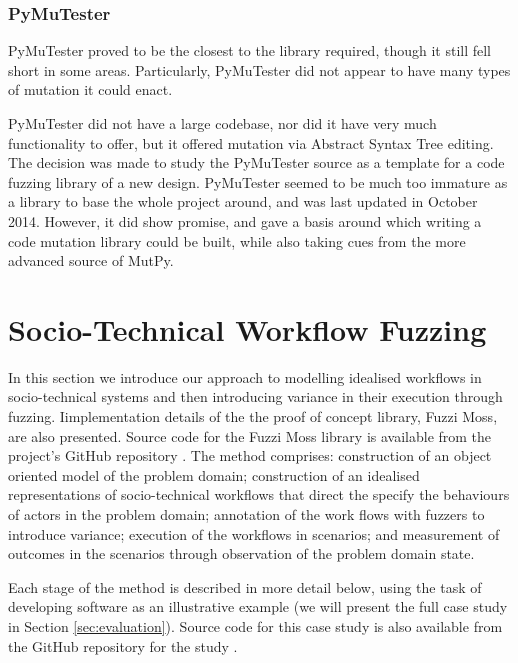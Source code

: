 \documentclass{sig-alternate}
\begin{document}
\subsubsection{PyMuTester}
\label{fuzzing_pymutester}
PyMuTester\cite{PyMutTester} proved to be the closest to the library required, though it still fell short in some areas. Particularly, PyMuTester did not appear to have many types of mutation it could enact. \par

PyMuTester did not have a large codebase\cite{PyMutTester}, nor did it have very much functionality to offer, but it offered mutation via Abstract Syntax Tree editing. The decision was made to study the PyMuTester source as a template for a code fuzzing library of a new design. PyMuTester seemed to be much too immature as a library to base the whole project around, and was last updated in October 2014. However, it did show promise, and gave a basis around which writing a code mutation library could be built, while also taking cues from the more advanced source of MutPy\cite{mutpy26}. \par



\section{Socio-Technical Workflow Fuzzing}


In this section we introduce our approach to modelling idealised workflows in
socio-technical systems and then introducing variance in their execution through
fuzzing.  Iimplementation details of the the proof of concept library, Fuzzi
Moss, are also presented.  Source code for the Fuzzi Moss library is available
from the project's GitHub repository \citep{wallis2016fuzzi-moss-scm}.  The
method comprises: construction of an object oriented model of the problem
domain; construction of an idealised representations of socio-technical
workflows that direct the specify the behaviours of actors in the problem
domain; annotation of the work flows with fuzzers to introduce variance;
execution of the workflows in scenarios; and measurement of outcomes in the
scenarios through observation of the problem domain state.

Each stage of the method is described in more detail below, using the task of
developing software as an illustrative example (we will present the full case
study in Section \ref{sec:evaluation}). Source code for this case study is also
available from the GitHub repository for the study
\citep{storer2016softdev-workflow-scm}.
\end{document}
